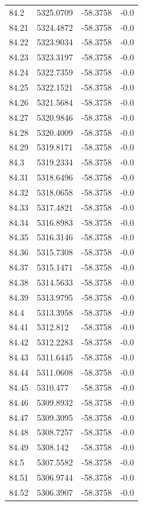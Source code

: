 \begin{table}[H]
\begin{tabular}{llll}
84.2 & 5325.0709 & -58.3758 & -0.0 \\
84.21 & 5324.4872 & -58.3758 & -0.0 \\
84.22 & 5323.9034 & -58.3758 & -0.0 \\
84.23 & 5323.3197 & -58.3758 & -0.0 \\
84.24 & 5322.7359 & -58.3758 & -0.0 \\
84.25 & 5322.1521 & -58.3758 & -0.0 \\
84.26 & 5321.5684 & -58.3758 & -0.0 \\
84.27 & 5320.9846 & -58.3758 & -0.0 \\
84.28 & 5320.4009 & -58.3758 & -0.0 \\
84.29 & 5319.8171 & -58.3758 & -0.0 \\
84.3 & 5319.2334 & -58.3758 & -0.0 \\
84.31 & 5318.6496 & -58.3758 & -0.0 \\
84.32 & 5318.0658 & -58.3758 & -0.0 \\
84.33 & 5317.4821 & -58.3758 & -0.0 \\
84.34 & 5316.8983 & -58.3758 & -0.0 \\
84.35 & 5316.3146 & -58.3758 & -0.0 \\
84.36 & 5315.7308 & -58.3758 & -0.0 \\
84.37 & 5315.1471 & -58.3758 & -0.0 \\
84.38 & 5314.5633 & -58.3758 & -0.0 \\
84.39 & 5313.9795 & -58.3758 & -0.0 \\
84.4 & 5313.3958 & -58.3758 & -0.0 \\
84.41 & 5312.812 & -58.3758 & -0.0 \\
84.42 & 5312.2283 & -58.3758 & -0.0 \\
84.43 & 5311.6445 & -58.3758 & -0.0 \\
84.44 & 5311.0608 & -58.3758 & -0.0 \\
84.45 & 5310.477 & -58.3758 & -0.0 \\
84.46 & 5309.8932 & -58.3758 & -0.0 \\
84.47 & 5309.3095 & -58.3758 & -0.0 \\
84.48 & 5308.7257 & -58.3758 & -0.0 \\
84.49 & 5308.142 & -58.3758 & -0.0 \\
84.5 & 5307.5582 & -58.3758 & -0.0 \\
84.51 & 5306.9744 & -58.3758 & -0.0 \\
84.52 & 5306.3907 & -58.3758 & -0.0 \\

\end{tabular}
\end{table}
